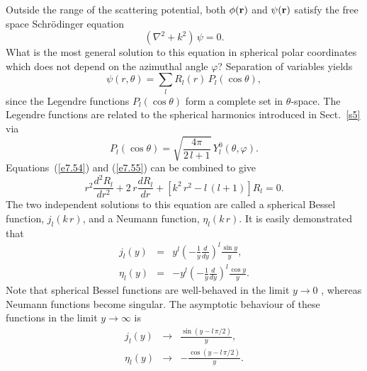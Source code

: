 Outside the range of the scattering potential, both $\phi({\bf r})$ and
$\psi({\bf r})$ satisfy the free space Schr\"{o}dinger equation 
\begin{equation}\label{e7.54}
(\nabla^2 + k^2)\,\psi = 0.
\end{equation}
What is the most general solution to this equation in spherical polar
coordinates which does not depend on the azimuthal angle $\varphi$?
Separation of variables yields
\begin{equation}\label{e7.55}
\psi(r,\theta) = \sum_l R_l(r)\, P_l(\cos\theta),
\end{equation}
since the Legendre functions $P_l(\cos\theta)$ form a complete
set in $\theta$-space. The Legendre functions are related to the
spherical harmonics introduced in Sect.~\ref{s5} via
\begin{equation}
P_l(\cos\theta) = \sqrt{\frac{4\pi}{2\,l+1}}\, Y_l^0(\theta,\varphi).
\end{equation}
Equations~(\ref{e7.54}) and (\ref{e7.55}) can be combined to give
\begin{equation}
r^2\frac{d^2 R_l}{dr^2} + 2\,r \frac{dR_l}{dr} +  [k^2 \,r^2 -
l\,(l+1)]R_l = 0.
\end{equation}
The two independent solutions to this equation are called a
spherical Bessel function, $j_l(k\,r)$, and a Neumann function,
$\eta_l(k\,r)$. 
It is easily demonstrated that
\begin{eqnarray}\label{e7.58a}
j_l(y) &=& y^l\left(-\frac{1}{y}\frac{d}{dy}\right)^l \frac{\sin y}{y},
\\[0.5ex]\label{e7.58b}
\eta_l(y) &=& -y^l\left(-\frac{1}{y}\frac{d}{dy}\right)^l \frac{\cos y}{y}.
\end{eqnarray}
Note that  spherical Bessel functions are well-behaved in the limit
$y\rightarrow 0$ , whereas  Neumann functions become singular.
The asymptotic behaviour of these functions in the limit $y\rightarrow
\infty$ is
\begin{eqnarray}\label{e7.59a}
j_l(y) &\rightarrow &\frac{\sin(y - l\,\pi/2)}{y},\\[0.5ex]
\eta_l(y) &\rightarrow & - \frac{\cos(y-l\,\pi/2)}{y}.\label{e7.59b}
\end{eqnarray}

